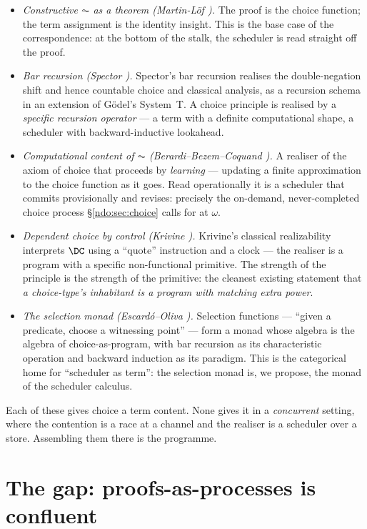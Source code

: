 \begin{itemize}[leftmargin=1.4em]
\item \emph{Constructive $\AC$ as a theorem (Martin-L\"of \cite{martinlof}).} The proof is the
choice function; the term assignment is the identity insight. This is the base case of the
correspondence: at the bottom of the stalk, the scheduler is read straight off the proof.
\item \emph{Bar recursion (Spector \cite{spector}).} Spector's bar recursion realises the
double-negation shift and hence countable choice and classical analysis, as a recursion schema in an
extension of G\"odel's System~T. A choice principle is realised by a \emph{specific recursion operator}
--- a term with a definite computational shape, a scheduler with backward-inductive lookahead.
\item \emph{Computational content of $\AC$ (Berardi--Bezem--Coquand \cite{bbc}).} A realiser of the
axiom of choice that proceeds by \emph{learning} --- updating a finite approximation to the choice
function as it goes. Read operationally it is a scheduler that commits provisionally and revises:
precisely the on-demand, never-completed choice process \S\ref{ndo:sec:choice} calls for at $\omega$.
\item \emph{Dependent choice by control (Krivine \cite{krivine}).} Krivine's classical realizability
interprets $\DC$ using a ``quote'' instruction and a clock --- the realiser is a program with a
specific non-functional primitive. The strength of the principle is the strength of the primitive:
the cleanest existing statement that \emph{a choice-type's inhabitant is a program with matching
extra power}.
\item \emph{The selection monad (Escard\'o--Oliva \cite{escardo}).} Selection functions ---
``given a predicate, choose a witnessing point'' --- form a monad whose algebra is the algebra of
choice-as-program, with bar recursion as its characteristic operation and backward induction as its
paradigm. This is the categorical home for ``scheduler as term'': the selection monad is, we propose,
the monad of the scheduler calculus.
\end{itemize}

\noindent
Each of these gives choice a term content. None gives it in a \emph{concurrent} setting, where the
contention is a race at a channel and the realiser is a scheduler over a store. Assembling them there
is the programme.

\section{The gap: proofs-as-processes is confluent}\label{chs:sec:gap}

